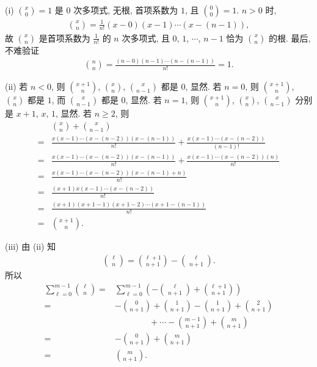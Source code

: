 \begin{pf}
    (i) $\binom{x}{0} = 1$ 是 $0$ 次多项式, 无根, 首项系数为 $1$, 且 $\binom{0}{0} = 1$. $n > 0$ 时,
    \begin{align*}
        \binom{x}{n} = \frac{1}{n!} (x - 0)(x - 1) \cdots (x - (n-1)),
    \end{align*}
    故 $\binom{x}{n}$ 是首项系数为 $\frac{1}{n!}$ 的 $n$ 次多项式, 且 $0$, $1$, $\cdots$, $n-1$ 恰为 $\binom{x}{n}$ 的根. 最后, 不难验证
    \begin{align*}
        \binom{n}{n} = \frac{(n-0)(n-1) \cdots (n - (n-1))}{n!} = 1.
    \end{align*}

    (ii) 若 $n<0$, 则 $\binom{x + 1}{n}$, $\binom{x}{n}$, $\binom{x}{n - 1}$ 都是 $0$, 显然. 若 $n=0$, 则 $\binom{x + 1}{n}$, $\binom{x}{n}$ 都是 $1$, 而 $\binom{x}{n - 1}$ 都是 $0$, 显然. 若 $n = 1$, 则 $\binom{x + 1}{n}$, $\binom{x}{n}$, $\binom{x}{n - 1}$ 分别是 $x+1$, $x$, $1$, 显然. 若 $n \geq 2$, 则
    \begin{align*}
             & \binom{x}{n} + \binom{x}{n - 1}                                                      \\
        = {} & \frac{x(x-1) \cdots (x-(n-2))(x-(n-1))}{n!} + \frac{x(x-1) \cdots (x-(n-2))}{(n-1)!} \\
        = {} & \frac{x(x-1) \cdots (x-(n-2))(x-(n-1))}{n!} + \frac{x(x-1) \cdots (x-(n-2))(n)}{n!}  \\
        = {} & \frac{x(x-1) \cdots (x-(n-2))(x-(n-1) + n)}{n!}                                      \\
        = {} & \frac{(x+1)x(x-1) \cdots (x-(n-2))}{n!}                                              \\
        = {} & \frac{(x+1)(x+1-1)(x+1-2) \cdots (x+1-(n-1))}{n!}                                    \\
        = {} & \binom{x + 1}{n}.
    \end{align*}

    (iii) 由 (ii) 知
    \begin{align*}
        \binom{\ell}{n} = \binom{\ell + 1}{n + 1} - \binom{\ell}{n + 1}.
    \end{align*}
    所以
    \begin{align*}
        \sum_{\ell = 0}^{m - 1} \binom{\ell}{n}
        = {} & \sum_{\ell = 0}^{m - 1} \left(-\binom{\ell}{n + 1}
        + \binom{\ell + 1}{n + 1} \right)                             \\
        = {} & -\binom{0}{n + 1} + \binom{1}{n + 1} -\binom{1}{n + 1}
        + \binom{2}{n + 1}                                            \\
             & \qquad \qquad
        + \cdots -\binom{m-1}{n + 1} + \binom{m}{n + 1}               \\
        = {} & -\binom{0}{n + 1} + \binom{m}{n + 1}                   \\
        = {} & \binom{m}{n + 1}.
    \end{align*}


\end{pf}
